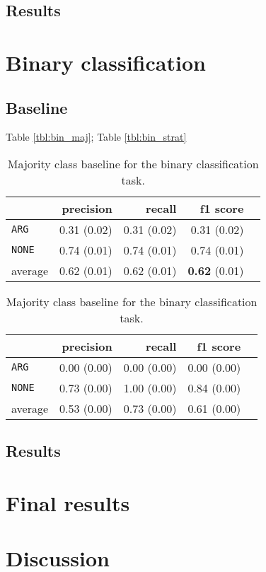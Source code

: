 \subsection{Results}





\section{Binary classification}
\subsection{Baseline}
Table \ref{tbl:bin_maj}; Table \ref{tbl:bin_strat}


\begin{table}[!htb]
    \begin{minipage}{.5\linewidth}
      \caption{Random (stratified) baseline for the binary classification task.}
      \label{foo}
      \centering
      
\begin{tabular}{@{}lrrrr@{}}
\toprule
 	&	 precision &	 recall &	 f1 score  \\ \midrule 
\texttt{ARG}	&	 0.31 \scriptsize{(0.02)} &	 0.31 \scriptsize{(0.02)} &	 0.31 \scriptsize{(0.02)}  \\ 
\texttt{NONE}	&	 0.74 \scriptsize{(0.01)} &	 0.74 \scriptsize{(0.01)} &	 0.74 \scriptsize{(0.01)}  \\ 
average	&	 0.62 \scriptsize{(0.01)} &	 0.62 \scriptsize{(0.01)} &	 \textbf{0.62} \scriptsize{(0.01)}  \\ 
\bottomrule
\end{tabular}

  \end{minipage}%
    \begin{minipage}{.5\linewidth}
      \centering
        \caption{Majority class baseline for the binary classification task.}
\begin{tabular}{@{}lrrrr@{}}
\toprule
 	&	 precision &	 recall &	 f1 score  \\ \midrule 
\texttt{ARG}	&	 0.00 \scriptsize{(0.00)} &	 0.00 \scriptsize{(0.00)} &	 0.00 \scriptsize{(0.00)}  \\ 
\texttt{NONE}	&	 0.73 \scriptsize{(0.00)} &	 1.00 \scriptsize{(0.00)} &	 0.84 \scriptsize{(0.00)}  \\ 
average	&	 0.53 \scriptsize{(0.00)} &	 0.73 \scriptsize{(0.00)} &	 0.61 \scriptsize{(0.00)}  \\ 
\bottomrule
\end{tabular}
    \end{minipage} 
\end{table}





\subsection{Results}

\section{Final results}
\label{sec:final}

\section{Discussion}